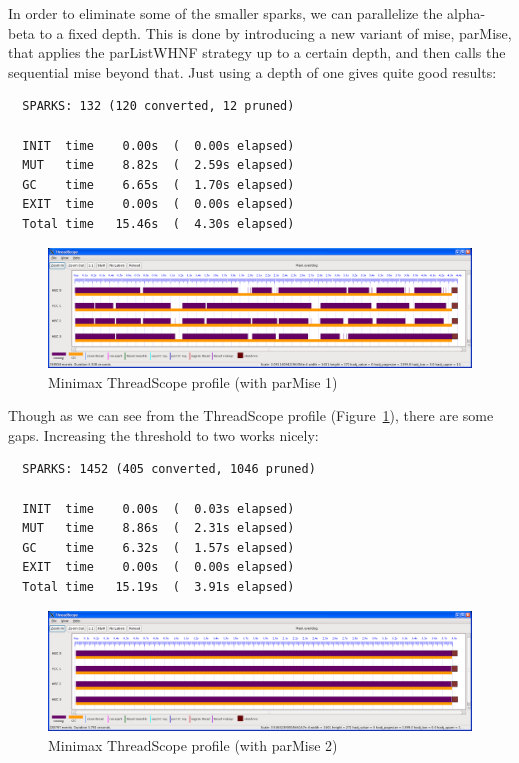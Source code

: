 \documentclass[twocolumn,9pt]{sigplanconf}
\newcommand{\codef}[1]{{\fontfamily{cmss}\small#1}}
\begin{document}
In order to eliminate some of the smaller sparks, we can
parallelize the alpha-beta to a fixed depth.  This is done by
introducing a new variant of \codef{mise}, \codef{parMise}, that
applies the \codef{parListWHNF} strategy up to a certain depth, and then
calls the sequential \codef{mise} beyond that.  Just using a depth of
one gives quite good results:

\begin{verbatim}
  SPARKS: 132 (120 converted, 12 pruned)

  INIT  time    0.00s  (  0.00s elapsed)
  MUT   time    8.82s  (  2.59s elapsed)
  GC    time    6.65s  (  1.70s elapsed)
  EXIT  time    0.00s  (  0.00s elapsed)
  Total time   15.46s  (  4.30s elapsed)
\end{verbatim}

\begin{figure}
\begin{center}
\includegraphics[scale=0.3]{minimax2.png}
\end{center}
\caption{Minimax ThreadScope profile (with parMise 1)}
\label{f:minimax-threadscope2}
\end{figure}

Though as we can see from the ThreadScope profile
(Figure~\ref{f:minimax-threadscope2}), there are some gaps.
Increasing the threshold to two works nicely:

\begin{verbatim}
  SPARKS: 1452 (405 converted, 1046 pruned)

  INIT  time    0.00s  (  0.03s elapsed)
  MUT   time    8.86s  (  2.31s elapsed)
  GC    time    6.32s  (  1.57s elapsed)
  EXIT  time    0.00s  (  0.00s elapsed)
  Total time   15.19s  (  3.91s elapsed)
\end{verbatim}

\begin{figure}
\begin{center}
\includegraphics[scale=0.3]{minimax3.png}
\end{center}
\caption{Minimax ThreadScope profile (with parMise 2)}
\label{f:minimax-threadscope3}
\end{figure}
\end{document}
